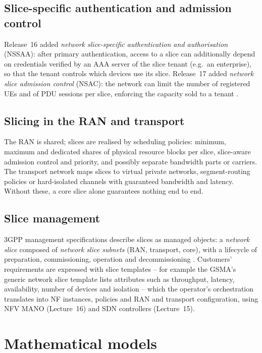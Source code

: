 \documentclass[11pt,a4paper]{article}
\begin{document}
\subsection{Slice-specific authentication and admission control}
Release~16 added \emph{network slice-specific authentication and authorisation} (NSSAA): after primary authentication, access to a slice can
additionally depend on credentials verified by an AAA server of the slice tenant (e.g.\ an enterprise), so that the tenant controls which
devices use its slice. Release~17 added \emph{network slice admission control} (NSAC): the network can limit the number of registered UEs
and of PDU sessions per slice, enforcing the capacity sold to a tenant \cite{ts23501}.

\subsection{Slicing in the RAN and transport}
The RAN is shared; slices are realised by scheduling policies: minimum, maximum and dedicated shares of physical resource blocks per slice,
slice-aware admission control and priority, and possibly separate bandwidth parts or carriers. The transport network maps slices to
virtual private networks, segment-routing policies or hard-isolated channels with guaranteed bandwidth and latency. Without these,
a core slice alone guarantees nothing end to end.

\subsection{Slice management}
3GPP management specifications describe slices as managed objects: a \emph{network slice} composed of \emph{network slice subnets} (RAN,
transport, core), with a lifecycle of preparation, commissioning, operation and decommissioning \cite{ts28530}. Customers' requirements are
expressed with slice templates -- for example the GSMA's generic network slice template lists attributes such as throughput, latency,
availability, number of devices and isolation -- which the operator's orchestration translates into NF instances, policies and RAN and
transport configuration, using NFV MANO (Lecture~16) and SDN controllers (Lecture~15).

\section{Mathematical models}
\end{document}

